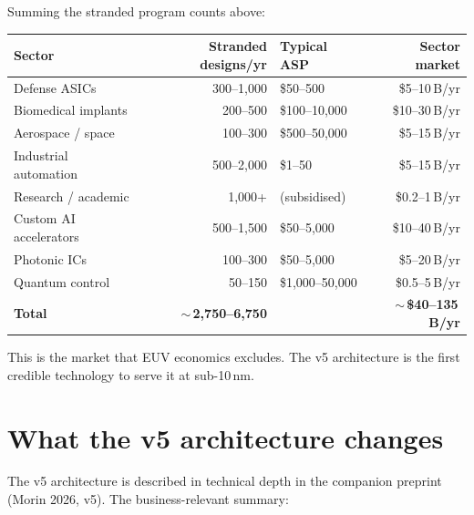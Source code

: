 \documentclass[11pt,letterpaper]{article}
\begin{document}
Summing the stranded program counts above:

\begin{center}
\begin{tabular}{lrlr}
\toprule
Sector & Stranded designs/yr & Typical ASP & Sector market \\
\midrule
Defense ASICs & 300--1{,}000 & \$50--500 & \$5--10\,B/yr \\
Biomedical implants & 200--500 & \$100--10{,}000 & \$10--30\,B/yr \\
Aerospace / space & 100--300 & \$500--50{,}000 & \$5--15\,B/yr \\
Industrial automation & 500--2{,}000 & \$1--50 & \$5--15\,B/yr \\
Research / academic & 1{,}000+ & (subsidised) & \$0.2--1\,B/yr \\
Custom AI accelerators & 500--1{,}500 & \$50--5{,}000 & \$10--40\,B/yr \\
Photonic ICs & 100--300 & \$50--5{,}000 & \$5--20\,B/yr \\
Quantum control & 50--150 & \$1{,}000--50{,}000 & \$0.5--5\,B/yr \\
\midrule
\textbf{Total} & \textbf{$\sim$\,2{,}750--6{,}750} & & \textbf{$\sim$\,\$40--135\,B/yr} \\
\bottomrule
\end{tabular}
\end{center}

This is the market that EUV economics excludes. The v5 architecture is the first credible technology to serve it at sub-10\,nm.

\section{What the v5 architecture changes}

The v5 architecture is described in technical depth in the companion preprint (Morin 2026, v5). The business-relevant summary:
\end{document}

